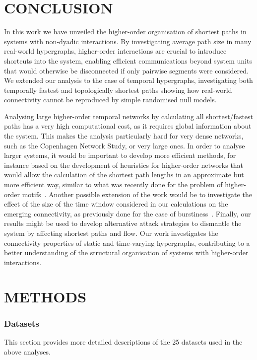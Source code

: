 \documentclass[a4paper,pre,reqno,superscriptaddress, twocolumn, floatfix]{revtex4}
\def\numdatasets{25 }
\def\ho{higher-order }
\begin{document}
\section*{CONCLUSION}

In this work we have unveiled the \ho organisation of shortest paths in systems with non-dyadic interactions.
By investigating average path size in many real-world hypergraphs, \ho interactions are crucial to introduce shortcuts into the system, enabling efficient communications beyond system units that would otherwise be disconnected if only pairwise segments were considered. 
We extended our analysis to the case of temporal hypergraphs, investigating both temporally fastest and topologically shortest paths showing how real-world connectivity cannot be reproduced by simple randomised null models. 

Analysing large \ho temporal networks by calculating all shortest/fastest paths has a very high computational cost, 
as it requires global information about the system.
This makes the analysis particularly hard for very dense networks, such as the Copenhagen Network Study, or very large ones. In order to analyse larger systems, it would be important to develop more efficient methods, for instance based on the development of heuristics for \ho networks that would allow the calculation of the shortest path lengths in an approximate but more efficient way, similar to what was recently done for the problem of \ho motifs~\cite{lotito2024exact}.
Another possible extension of the work would be to investigate the effect of the size of the time window considered in our calculations on the emerging connectivity, as previously done for the case of burstiness~\cite{karsai2011small, cencetti2021temporal}. Finally, our results might be used to develop alternative attack strategies to dismantle the system by affecting shortest paths and flow.
Our work investigates the connectivity properties of static
and time-varying hypergraphs, contributing to a better understanding of the structural organisation of systems with \ho interactions.








\section*{METHODS}


\subsubsection*{Datasets}
This section provides more detailed descriptions of the \numdatasets datasets used in the above analyses. 
    
\end{document}
